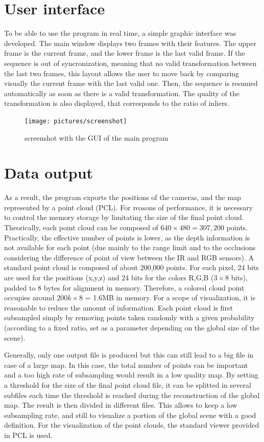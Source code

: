 \clearpage
\section{User interface}
To be able to use the program in real time, a simple graphic interface was developed. The main window displays two frames with their features. The upper frame is the current frame, and the lower frame is the last valid frame. If the sequence is out of syncronization, meaning that no valid transformation between the last two frames, this layout allows the user to move back by comparing visually the current frame with the last valid one. Then, the sequence is resumed automatically as soon as there is a valid transformation. The quality of the transformation is also displayed, that corresponds to the ratio of inliers.
\begin{figure}[H]
\centering
\texttt{[image: pictures/screenshot]}\\
\caption{screenshot with the GUI of the main program}
\end{figure}

\clearpage
\section{Data output}

As a result, the program exports the positions of the cameras, and the map represented by a point cloud (\gls{PCL}). For reasons of performance, it is necessary to control the memory storage by limitating the size of the final point cloud. Theorically, each point cloud can be composed of $640\times480 = 307,200$ points. Practically, the effective number of points is lower, as the depth information is not available for each point (due mainly to the range limit and to the occlusions considering the difference of point of view between the IR and RGB sensors). A standard point cloud is composed of about 200,000 points. For each pixel, 24 bits are used for the positions (x,y,z) and 24 bits for the colors R,G,B ($3\times8$ bits), padded to 8 bytes for alignment in memory. Therefore, a colored cloud point occupies around $200k\times8$ = 1.6MB in memory. For a scope of visualization, it is reasonable to reduce the amount of information. Each point cloud is first subsampled simply by removing points taken randomly with a given probability (according to a fixed ratio, set as a parameter depending on the global size of the scene).

Generally, only one output file is produced but this can still lead to a big file in case of a large map. In this case, the total number of points can be  important and a too high rate of subsampling would result in a low quality map. By setting a threshold for the size of the final point cloud file, it can be splitted in several subfiles each time the threshold is reached during the reconstruction of the global map. The result is then divided in different files. This allows to keep a low subsampling rate, and still to visualize a portion of the global scene with a good definition. For the visualization of the point clouds, the standard viewer provided in \gls{PCL} is used.


